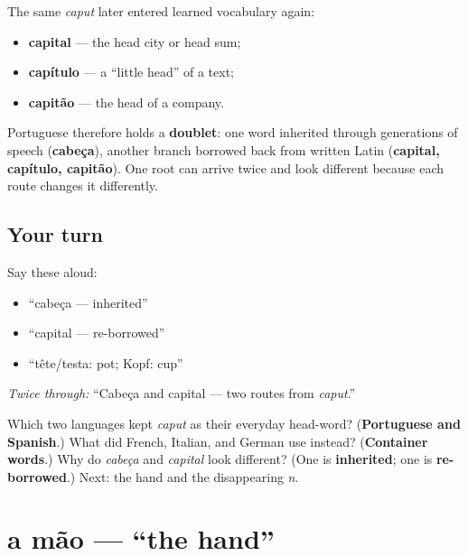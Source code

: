 \begin{cousinweb}
The same \emph{caput} later entered learned vocabulary again:

\begin{itemize}
\raggedright
  \item \textbf{capital} — the head city or head sum;
  \item \textbf{capítulo} — a “little head” of a text;
  \item \textbf{capitão} — the head of a company.
\end{itemize}

Portuguese therefore holds a \textbf{doublet}: one word inherited through generations of speech (\textbf{cabeça}), another branch borrowed back from written Latin (\textbf{capital, capítulo, capitão}). One root can arrive twice and look different because each route changes it differently.
\end{cousinweb}

\subsection*{Your turn}
Say these aloud:

\begin{itemize}
\raggedright
  \item “cabeça — inherited”
  \item “capital — re-borrowed”
  \item “tête/testa: pot; Kopf: cup”
\end{itemize}

\emph{Twice through:} “Cabeça and capital — two routes from \emph{caput}.”

\begin{tcolorbox}[breakable,colback=teal!4,colframe=teal!35!black,title={Before you move on}]
Which two languages kept \emph{caput} as their everyday head-word? (\textbf{Portuguese and Spanish}.) What did French, Italian, and German use instead? (\textbf{Container words}.) Why do \emph{cabeça} and \emph{capital} look different? (One is \textbf{inherited}; one is \textbf{re-borrowed}.) Next: the hand and the disappearing \emph{n}.
\end{tcolorbox}
\section[a mão]{a mão — \textquotedblleft{}the hand\textquotedblright{}}

\label{lesson:PT-C17-mao}



